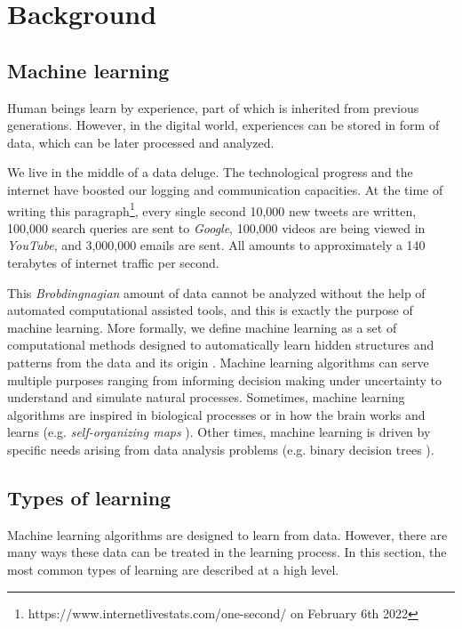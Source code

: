 \chapter{Background} \label{ch:background}
\section{Machine learning}
Human beings learn by experience, part of which is inherited from previous generations. However, in the digital world, experiences can be stored in form of data, which can be later processed and analyzed.

We live in the middle of a data deluge. The technological progress and the internet have boosted our logging and communication capacities. At the time of writing this paragraph\footnote{https://www.internetlivestats.com/one-second/ on February 6th 2022}, every single second 10,000 new tweets are written, 100,000 search queries are sent to \textit{Google}, 100,000 videos are being viewed in \textit{YouTube}, and 3,000,000 emails are sent. All amounts to approximately a 140 terabytes of internet traffic per second.

This \textit{Brobdingnagian} amount of data cannot be analyzed without the help of automated computational assisted tools, and this is exactly the purpose of machine learning. More formally, we define machine learning as a set of computational methods designed to automatically learn hidden structures and patterns from the data and its origin \autocite{murphy2012, theodoridis2015}. Machine learning algorithms can serve multiple purposes ranging from informing decision making under uncertainty to understand and simulate natural processes. Sometimes, machine learning algorithms are inspired in biological processes or in how the brain works and learns \autocite{haykin1998} (e.g. \textit{self-organizing maps} \autocite{kohonen2001}). Other times, machine learning is driven by specific needs arising from data analysis problems (e.g. binary decision trees \autocite{hastie2009, hastie2014}).

\section{Types of learning}
Machine learning algorithms are designed to learn from data. However, there are many ways these data can be treated in the learning process. In this section, the most common types of learning are described at a high level.

